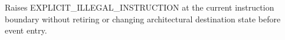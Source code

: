 Raises EXPLICIT\_ILLEGAL\_INSTRUCTION at the current instruction boundary without retiring or changing architectural destination state before event entry.

